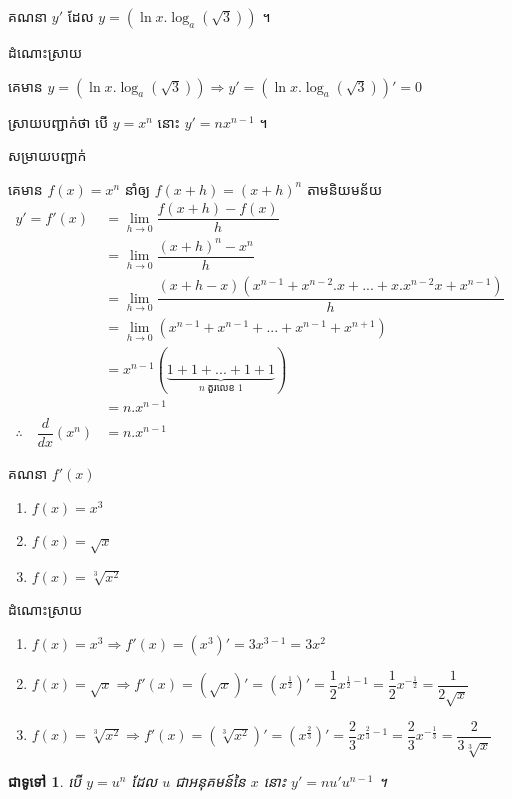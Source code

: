 \documentclass[12pt,fleqn]{book} %
\newtheorem{general}{\kml ជាទូទៅ}
\newcommand{\answer}{\begin{center}
\kml \color{magenta} ដំណោះស្រាយ
\end{center}}
\newcommand{\solution}{{\begin{center}\kml \color{magenta} សម្រាយបញ្ជាក់\end{center} }}
\begin{document}
\begin{example}
គណនា $y'$ ដែល $y=\left(\ln x .\log_a (\sqrt{3}) \right)$ ។
\end{example}
\answer 
គេមាន $y=\left(\ln x .\log_a (\sqrt{3}) \right)\Rightarrow y'=\left(\ln x .\log_a (\sqrt{3}) \right)'=0$
\begin{example}
ស្រាយបញ្ជាក់ថា បើ $y=x^n$ នោះ $y'=nx^{n-1}$ ។
\end{example}
\solution
គេមាន $f(x)=x^n$ នាំឲ្យ $f(x+h)=(x+h)^n$ តាមនិយមន័យ
\begin{align*}
y'=f'(x)&=\lim_{h\to 0}\dfrac{f(x+h)-f(x)}{h}\\
&=\lim_{h\to 0}\dfrac{(x+h)^n-x^n}{h}\\
&=\lim_{h\to 0}\dfrac{(x+h-x)(x^{n-1}+x^{n-2}.x+...+x.x^{n-2}x+x^{n-1})}{h}\\
&=\lim_{h\to 0}(x^{n-1}+x^{n-1}+...+x^{n-1}+x^{n+1})\\
&=x^{n-1}(\underbrace{1+1+...+1+1}_{n\; \text{តួរលេខ 1}})\\
&=n.x^{n-1}\\
\therefore \quad \dfrac{d}{dx}(x^n)&=n.x^{n-1}
\end{align*}
\begin{example}
គណនា $f'(x)$ 
\begin{multicols}{3}
\begin{enumerate}
\item $f(x)=x^3$
\item $f(x)=\sqrt{x}$
\item $f(x)=\sqrt[3]{x^2}$
\end{enumerate}
\end{multicols}
\end{example}
\answer 
\begin{enumerate}
\item $f(x)=x^3 \Rightarrow f'(x)=(x^3)'=3 x^{3-1}=3x^2$
\item $f(x)=\sqrt{x} \Rightarrow f'(x)=(\sqrt{x})'=(x^{\frac{1}{2}})'=\dfrac{1}{2}x^{\frac{1}{2}-1}=\dfrac{1}{2}x^{-\frac{1}{2}}=\dfrac{1}{2\sqrt{x}}$
\item $f(x)=\sqrt[3]{x^2}\Rightarrow f'(x)=(\sqrt[3]{x^2})'=(x^{\frac{2}{3}})'=\dfrac{2}{3}x^{\frac{2}{3}-1}=\dfrac{2}{3}x^{-\frac{1}{3}}=\dfrac{2}{3\sqrt[3]{x}}$
\end{enumerate}
\begin{general}
បើ $y=u^n$ ដែល $u$ ជាអនុគមន៍នៃ $x$ នោះ $y'=n u' u^{n-1}$  ។  
\end{general}
\end{document}
